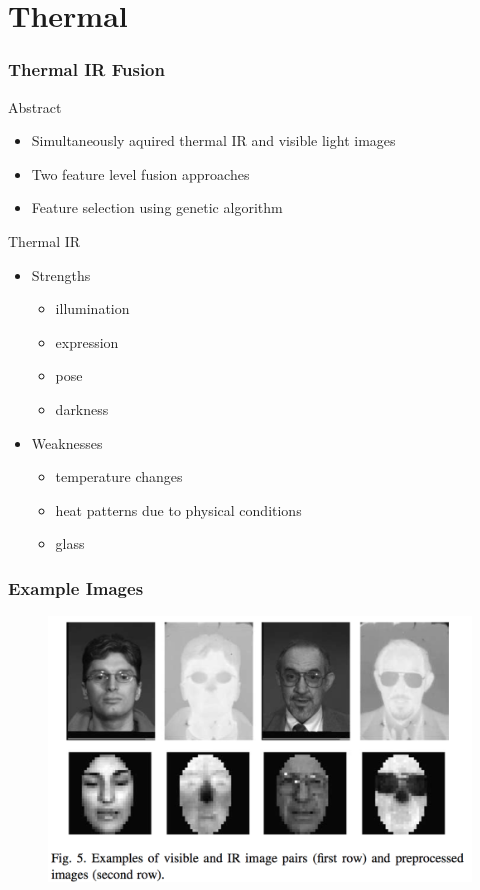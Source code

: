 \documentclass{beamer}
\begin{document}
\section{Thermal}
\begin{frame}
\frametitle{Thermal IR Fusion}
\begin{block}{Abstract}
\begin{itemize}
\item Simultaneously aquired thermal IR and visible light images
\item Two feature level fusion approaches
\item Feature selection using genetic algorithm
\end{itemize}
\end{block}
\pause
\begin{block}{Thermal IR}
\begin{itemize}
\item Strengths
\begin{itemize}
\item illumination
\item expression
\item pose
\item darkness
\end{itemize}
\item Weaknesses
\begin{itemize}
\item temperature changes
\item heat patterns due to physical conditions
\item glass
\end{itemize}
\end{itemize} 
\end{block}
\end{frame}

\begin{frame}
\frametitle{Example Images}
\begin{figure}
\includegraphics[width=\textwidth]{exampleir}
\end{figure}
\end{frame}
\end{document}
